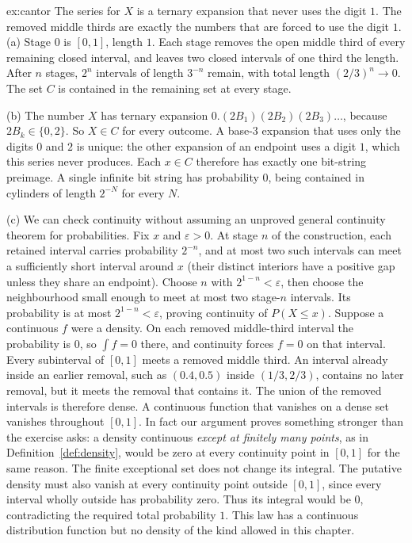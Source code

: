\begin{solution}{ex:cantor}
\idea The series for $X$ is a ternary expansion that never uses the digit $1$. The removed middle thirds are exactly the numbers that are forced to use the digit $1$.
\writeup (a) Stage $0$ is $[0,1]$, length $1$. Each stage removes the open middle third of every remaining closed interval, and leaves two closed intervals of one third the length. After $n$ stages, $2^n$ intervals of length $3^{-n}$ remain, with total length $(2/3)^n\to0$. The set $C$ is contained in the remaining set at every stage.

(b) The number $X$ has ternary expansion $0.(2B_1)(2B_2)(2B_3)\ldots$, because $2B_k\in\{0,2\}$. So $X\in C$ for every outcome. A base-$3$ expansion that uses only the digits $0$ and $2$ is unique: the other expansion of an endpoint uses a digit $1$, which this series never produces. Each $x\in C$ therefore has exactly one bit-string preimage. A single infinite bit string has probability $0$, being contained in cylinders of length $2^{-N}$ for every $N$.

(c) We can check continuity without assuming an unproved general continuity theorem for probabilities. Fix $x$ and $\varepsilon>0$. At stage $n$ of the construction, each retained interval carries probability $2^{-n}$, and at most two such intervals can meet a sufficiently short interval around $x$ (their distinct interiors have a positive gap unless they share an endpoint). Choose $n$ with $2^{1-n}<\varepsilon$, then choose the neighbourhood small enough to meet at most two stage-$n$ intervals. Its probability is at most $2^{1-n}<\varepsilon$, proving continuity of $P(X\le x)$. Suppose a continuous $f$ were a density. On each removed middle-third interval the probability is $0$, so $\int f=0$ there, and continuity forces $f=0$ on that interval. Every subinterval of $[0,1]$ meets a removed middle third. An interval already inside an earlier removal, such as $(0.4,0.5)$ inside $(1/3,2/3)$, contains no later removal, but it meets the removal that contains it. The union of the removed intervals is therefore dense. A continuous function that vanishes on a dense set vanishes throughout $[0,1]$. In fact our argument proves something stronger than the exercise asks: a density continuous \emph{except at finitely many points}, as in Definition~\ref{def:density}, would be zero at every continuity point in $[0,1]$ for the same reason. The finite exceptional set does not change its integral. The putative density must also vanish at every continuity point outside $[0,1]$, since every interval wholly outside has probability zero. Thus its integral would be $0$, contradicting the required total probability $1$. This law has a continuous distribution function but no density of the kind allowed in this chapter.
\end{solution}

